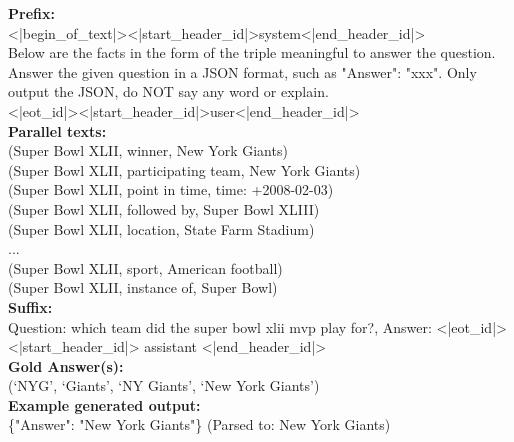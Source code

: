 \begin{tcolorbox}[title=Mintaka]
\textbf{Prefix:}\\
<|begin\_of\_text|><|start\_header\_id|>system<|end\_header\_id|>\\

Below are the facts in the form of the triple meaningful to answer the question. Answer the given question in a JSON format, such as {"Answer": "xxx"}. Only output the JSON, do NOT say any word or explain.\\

<|eot\_id|><|start\_header\_id|>user<|end\_header\_id|>\\

\textbf{Parallel texts:}\\
(Super Bowl XLII, winner, New York Giants) \\
(Super Bowl XLII, participating team, New York Giants) \\
(Super Bowl XLII, point in time, time: +2008-02-03) \\
(Super Bowl XLII, followed by, Super Bowl XLIII) \\
(Super Bowl XLII, location, State Farm Stadium) \\
... \\
(Super Bowl XLII, sport, American football) \\
(Super Bowl XLII, instance of, Super Bowl) \\

\textbf{Suffix: }\\
Question: which team did the super bowl xlii mvp play for?, Answer: <|eot\_id|><|start\_header\_id|> assistant 
<|end\_header\_id|> \\

\textbf{Gold Answer(s): }\\
(`NYG', `Giants', `NY Giants', `New York Giants') \\

\textbf{Example generated output: }\\
\{"Answer": "New York Giants"\} (Parsed to: New York Giants)


\end{tcolorbox}

\noindent\begin{minipage}{\textwidth}
\label{Mintaka}
\end{minipage}


